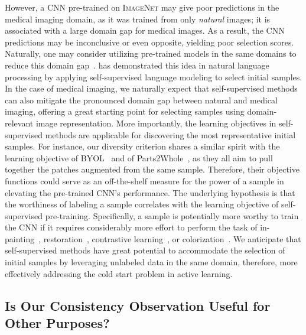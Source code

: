 However, a CNN pre-trained on \textsc{ImageNet} may give poor predictions in the medical imaging domain, as it was trained from only {\em natural} images; it is associated with a large domain gap for medical images. As a result, the CNN predictions may be inconclusive or even opposite, yielding poor selection scores. Naturally, one may consider utilizing pre-trained models in the same domains to reduce this domain gap~\citep{zhou2021models,haghighi2020learning,feng2020parts2whole}. \citet{yuan2020cold} has demonstrated this idea in natural language processing by applying self-supervised language modeling to select initial samples. In the case of medical imaging, we naturally expect that self-supervised methods can also mitigate the pronounced domain gap between natural and medical imaging, offering a great starting point for selecting samples using domain-relevant image representation. More importantly, the learning objectives in self-supervised methods are applicable for discovering the most representative initial samples. 
For instance, our diversity criterion shares a similar spirit with the learning objective of BYOL~\citep{grill2020bootstrap} and of Parts2Whole~\citep{feng2020parts2whole}, as they all aim to pull together the patches augmented from the same sample.
Therefore, their objective functions could serve as an off-the-shelf measure for the power of a sample in elevating the pre-trained CNN's performance. The underlying hypothesis is that the worthiness of labeling a sample correlates with the learning objective of self-supervised pre-training. Specifically, a sample is potentially more worthy to train the CNN if it requires considerably more effort to perform the task of in-painting~\citep{pathak2016context}, restoration~\citep{zhou2021models}, contrastive learning~\citep{chen2020simple}, or colorization~\citep{zhang2016colorful}. We anticipate that self-supervised methods have great potential to accommodate the selection of initial samples by leveraging unlabeled data in the same domain, therefore, more effectively addressing the cold start problem in active learning. 

\subsection{Is Our Consistency Observation Useful for Other Purposes?}
\label{ch3:discussion_conclusion:consistency_observation_other_purposes}

